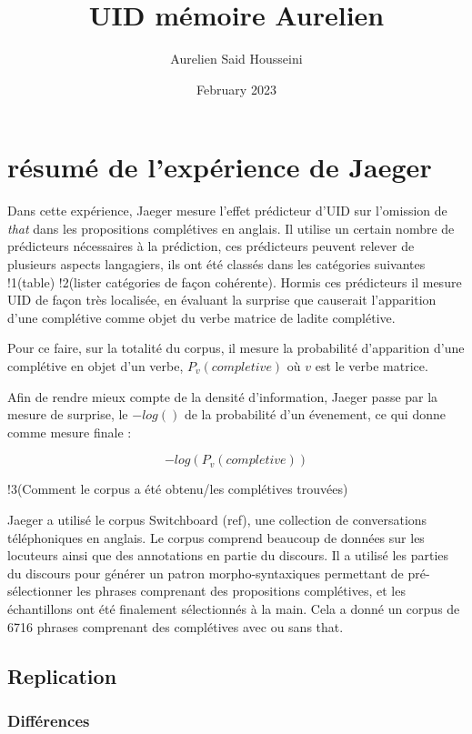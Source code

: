 \documentclass{article}
\title{UID mémoire Aurelien}
\author{Aurelien Said Housseini}
\date{February 2023}
\begin{document}
\maketitle

\tableofcontents

\newpage

\section{résumé de l’expérience de Jaeger} 

	Dans cette expérience, Jaeger mesure l'effet prédicteur d'UID sur l'omission de \textit{that} dans les propositions complétives en anglais. 
	Il utilise un certain nombre de prédicteurs nécessaires à la prédiction, ces prédicteurs peuvent relever de plusieurs aspects langagiers, ils ont été classés dans les catégories suivantes !1(table) !2(lister catégories de façon cohérente).
	Hormis ces prédicteurs il mesure UID de façon très localisée, en évaluant la surprise que causerait l'apparition d'une complétive comme objet du verbe matrice de ladite complétive.

    Pour ce faire, sur la totalité du corpus, il mesure la probabilité d'apparition d'une complétive en objet d'un verbe, $P_v(completive)$ où $v$ est le verbe matrice.

    Afin de rendre mieux compte de la densité d'information, Jaeger passe par la mesure de surprise, le $-log()$ de la probabilité d'un évenement, ce qui donne comme mesure finale : 

    \[-log(P_v(completive))\]

	!3(Comment le corpus a été obtenu/les complétives trouvées)

    Jaeger a utilisé le corpus Switchboard (ref), une collection de conversations téléphoniques en anglais. Le corpus comprend beaucoup de données sur les locuteurs ainsi que des annotations en partie du discours. Il a utilisé les parties du discours pour générer un patron morpho-syntaxiques permettant de pré-sélectionner les phrases comprenant des propositions complétives, et les échantillons ont été finalement sélectionnés à la main. Cela a donné un corpus de 6716 phrases comprenant des complétives avec ou sans that.


\subsection{Replication}

\subsubsection{Différences}
\end{document}
